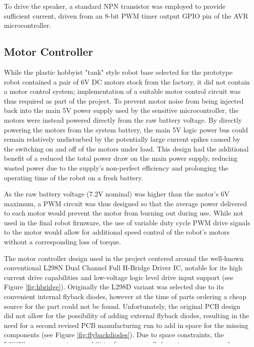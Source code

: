 To drive the speaker, a standard NPN transistor was employed to provide sufficient current, driven from an 8-bit PWM timer output GPIO pin of the AVR microcontroller.

\FloatBarrier
\subsection{Motor Controller}

While the plastic hobbyist "tank" style robot base selected for the prototype robot contained a pair of 6V DC motors stock from the factory, it did not contain a motor control system; implementation of a suitable motor control circuit was thus required as part of the project. To prevent motor noise from being injected back into the main 5V power supply used by the sensitive microcontroller, the motors were instead powered directly from the raw battery voltage. By directly powering the motors from the system battery, the main 5V logic power bus could remain relatively undisturbed by the potentially large current spikes caused by the switching on and off of the motors under load. This design had the additional benefit of a reduced the total power draw on the main power supply, reducing wasted power due to the supply's non-perfect efficiency and prolonging the operating time of the robot on a fresh battery.

As the raw battery voltage (7.2V nominal) was higher than the motor's 6V maximum, a PWM circuit was thus designed so that the average power delivered to each motor would prevent the motor from burning out during use. While not used in the final robot firmware, the use of variable duty cycle PWM drive signals to the motor would allow for additional speed control of the robot's motors without a corresponding loss of torque.

The motor controller design used in the project centered around the well-known conventional L298N Dual Channel Full H-Bridge Driver IC, notable for its high current drive capabilities and low-voltage logic level drive input support (see Figure \ref{fig:hbridge}). Originally the L298D variant was selected due to its convenient internal flyback diodes, however at the time of parts ordering a cheap source for the part could not be found. Unfortunately, the original PCB design did not allow for the possibility of adding external flyback diodes, resulting in the need for a second revised PCB manufacturing run to add in space for the missing components (see Figure \ref{fig:flybackdiodes}). Due to space constraints, the L298N's current sensing capabilities for motor stall detection were not used.

